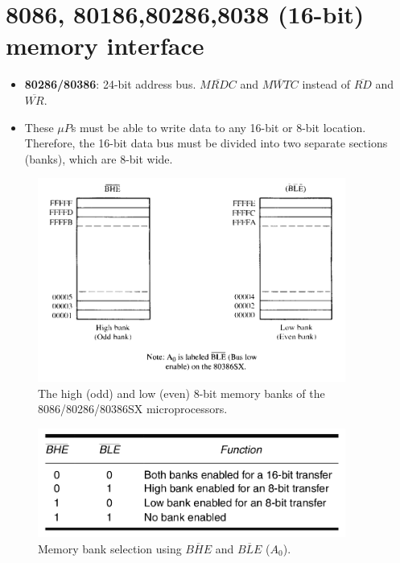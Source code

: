 \section{8086, 80186,80286,8038 (16-bit) memory interface}
\begin{itemize}
  \item \textbf{80286/80386}: 24-bit address bus. $\overline{MRDC}$ and $\overline{MWTC}$ instead of $\overline{RD}$ and $\overline{WR}$.
  \item These $\mu P$s must be able to write data to any 16-bit or 8-bit location. Therefore, the 16-bit data bus must be divided into two separate sections (banks), which are 8-bit wide.
\end{itemize}

\begin{figure}[h!]
    \includegraphics[width=0.9\textwidth]{./figures/Bank_Enable.png}
    \caption{The high (odd) and low (even) 8-bit memory banks of the 8086/80286/80386SX microprocessors.}
    \label{fig:BHE}
\end{figure}
\newpage
\begin{figure}[h!]
    \includegraphics[width=0.9\textwidth]{./figures/Bank_Table.png}
    \caption{Memory bank selection using $\overline{BHE}$ and $\overline{BLE}$ ($A_0$).}
    \label{fig:BHE_Table}
\end{figure}

